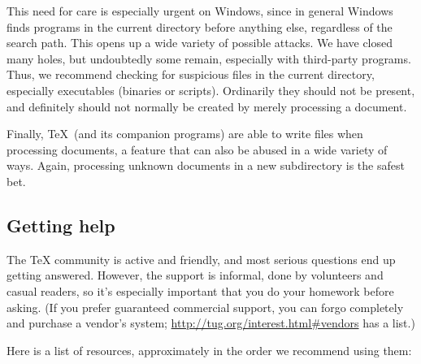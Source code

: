 \documentclass{article}
\begin{document}
This need for care is especially urgent on Windows, since in general
Windows finds programs in the current directory before anything else,
regardless of the search path.  This opens up a wide variety of possible
attacks.  We have closed many holes, but undoubtedly some remain,
especially with third-party programs.  Thus, we recommend checking for
suspicious files in the current directory, especially executables
(binaries or scripts).  Ordinarily they should not be present, and
definitely should not normally be created by merely processing a document.

Finally, \TeX\ (and its companion programs) are able to write files when
processing documents, a feature that can also be abused in a wide
variety of ways.  Again, processing unknown documents in a new
subdirectory is the safest bet.


\subsection{Getting help}
\label{sec:help}

The \TeX{} community is active and friendly, and most serious questions
end up getting answered.  However, the support is informal, done by
volunteers and casual readers, so it's especially important that you do
your homework before asking.  (If you prefer guaranteed commercial
support, you can forgo \TL{} completely and purchase a vendor's system;
\url{http://tug.org/interest.html#vendors} has a list.)

Here is a list of resources, approximately in the order we recommend
using them:
\end{document}
